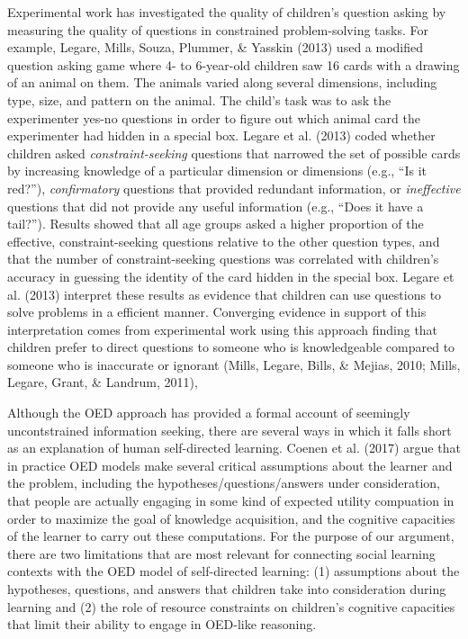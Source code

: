 \documentclass[a4paper,man,apacite,floatsintext]{apa6}
\begin{document}
Experimental work has investigated the quality of children's question
asking by measuring the quality of questions in constrained
problem-solving tasks. For example, Legare, Mills, Souza, Plummer, \&
Yasskin (2013) used a modified question asking game where 4- to
6-year-old children saw 16 cards with a drawing of an animal on them.
The animals varied along several dimensions, including type, size, and
pattern on the animal. The child's task was to ask the experimenter
yes-no questions in order to figure out which animal card the
experimenter had hidden in a special box. Legare et al. (2013) coded
whether children asked \emph{constraint-seeking} questions that narrowed
the set of possible cards by increasing knowledge of a particular
dimension or dimensions (e.g., ``Is it red?''), \emph{confirmatory}
questions that provided redundant information, or \emph{ineffective}
questions that did not provide any useful information (e.g., ``Does it
have a tail?''). Results showed that all age groups asked a higher
proportion of the effective, constraint-seeking questions relative to
the other question types, and that the number of constraint-seeking
questions was correlated with children's accuracy in guessing the
identity of the card hidden in the special box. Legare et al. (2013)
interpret these results as evidence that children can use questions to
solve problems in a efficient manner. Converging evidence in support of
this interpretation comes from experimental work using this approach
finding that children prefer to direct questions to someone who is
knowledgeable compared to someone who is inaccurate or ignorant (Mills,
Legare, Bills, \& Mejias, 2010; Mills, Legare, Grant, \& Landrum, 2011),

Although the OED approach has provided a formal account of seemingly
uncontstrained information seeking, there are several ways in which it
falls short as an explanation of human self-directed learning. Coenen et
al. (2017) argue that in practice OED models make several critical
assumptions about the learner and the problem, including the
hypotheses/questions/answers under consideration, that people are
actually engaging in some kind of expected utility compuation in order
to maximize the goal of knowledge acquisition, and the cognitive
capacities of the learner to carry out these computations. For the
purpose of our argument, there are two limitations that are most
relevant for connecting social learning contexts with the OED model of
self-directed learning: (1) assumptions about the hypotheses, questions,
and answers that children take into consideration during learning and
(2) the role of resource constraints on children's cognitive capacities
that limit their ability to engage in OED-like reasoning.
\end{document}
